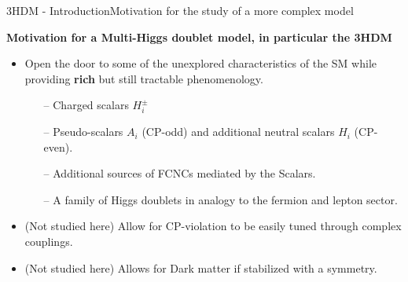 \documentclass[10pt,xcolor=dvipsnames,mathserif]{beamer}
\newcommand{\blue}[0]{\color{blue}}
\begin{document}
\begin{frame}{3HDM - Introduction}{Motivation for the study of a more complex model}
\begin{center}
    {\bf Motivation for a Multi-Higgs doublet model, in particular the 3HDM}
\end{center}
    \vskip3mm
    \begin{itemize}
        \item Open the door to some of the unexplored characteristics  of  the  SM  while  providing \textbf{rich} but still tractable phenomenology. 
        \begin{itemize}
            \item[--] Charged scalars $H^\pm_i$
            \item[--] Pseudo-scalars $A_i$ (CP-odd) and additional neutral scalars $H_i$ (CP-even).
            \item[--] Additional sources of FCNCs mediated by the Scalars.
            \item[--] A family of Higgs doublets in analogy to the fermion and lepton sector.
        \end{itemize} 
    	\item {\blue (Not studied here)} Allow for CP-violation to be easily tuned through complex couplings. 
    	\item {\blue (Not studied here)} Allows for Dark matter if stabilized with a symmetry. 
    \end{itemize}
     
\end{frame}
    
\end{document}

